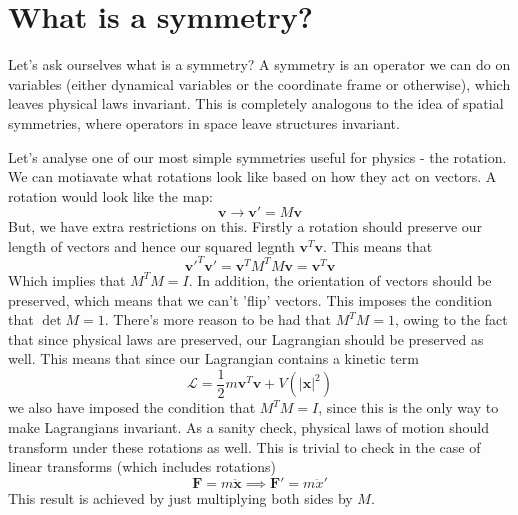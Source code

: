 \section{What is a symmetry?}
Let's ask ourselves what is a symmetry? A symmetry is an operator we can do on variables (either dynamical variables or the coordinate frame or otherwise), which leaves physical laws invariant. This is completely analogous to the idea of spatial symmetries, where operators in space leave structures invariant. 

Let's analyse one of our most simple symmetries useful for physics - the rotation. We can motiavate what rotations look like based on how they act on vectors. A rotation would look like the map: 
\[ 
	\mathbf{v} \rightarrow \mathbf{v}' =  M \mathbf{v} 
\] 
But, we have extra restrictions on this. Firstly a rotation should preserve our length of vectors and hence our squared legnth $\mathbf{v}^T \mathbf{v} $. This means that 
\[ 
	\mathbf{v}'^T \mathbf{v}' = \mathbf{v}^T  M^T M \mathbf{v}  = \mathbf{v}^T \mathbf{v} 
\]
Which implies that $M^T M = I$. In addition, the orientation of vectors should be preserved, which means that we can't 'flip' vectors. This imposes the condition that $\det M = 1$.  
There's more reason to be had that $M^T M  =1$, owing to the fact that since physical laws are preserved, our Lagrangian should be preserved as well. 
This means that since our Lagrangian contains a kinetic term
\[ 
	\mathcal{L }  = \frac{1}{ 2} m \mathbf{v}^T \mathbf{v} + V( |\mathbf{x}|^2 ) \] 
we also have imposed the condition that $M^T M = I$, since this is the only way to make Lagrangians invariant. As a sanity check, physical laws of motion should transform under these rotations as well. This is trivial to check in the case of linear transforms (which includes rotations)
\[ 
	\mathbf{F}  = m \ddot{ \mathbf{x} } \implies \mathbf{F}' = m \ddot{x}  ' 
\]  
This result is achieved by just multiplying both sides by $M$. 


